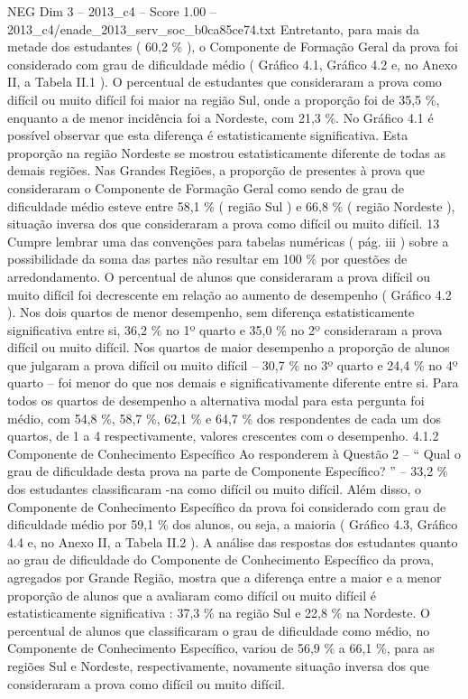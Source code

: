 \begin{textsample}{NEG Dim 3 – 2013\_c4 – Score 1.00 – 2013\_c4/enade\_2013\_serv\_soc\_b0ca85ce74.txt}
Entretanto, para mais da metade dos estudantes ( 60,2 \% ), o Componente de Formação Geral da prova foi considerado com grau de dificuldade médio ( Gráfico 4.1, Gráfico 4.2 e, no Anexo II, a Tabela II.1 ).
O percentual de estudantes que consideraram a prova como difícil ou muito difícil foi maior na região Sul, onde a proporção foi de 35,5 \%, enquanto a de menor incidência foi a Nordeste, com 21,3 \%.
No Gráfico 4.1 é possível observar que esta diferença é estatisticamente significativa.
Esta proporção na região Nordeste se mostrou estatisticamente diferente de todas as demais regiões.
Nas Grandes Regiões, a proporção de presentes à prova que consideraram o Componente de Formação Geral como sendo de grau de dificuldade médio esteve entre 58,1 \% ( região Sul ) e 66,8 \% ( região Nordeste ), situação inversa dos que consideraram a prova como difícil ou muito difícil. 13 Cumpre lembrar uma das convenções para tabelas numéricas ( pág. iii ) sobre a possibilidade da soma das partes não resultar em 100 \% por questões de arredondamento.
O percentual de alunos que consideraram a prova difícil ou muito difícil foi decrescente em relação ao aumento de desempenho ( Gráfico 4.2 ).
Nos dois quartos de menor desempenho, sem diferença estatisticamente significativa entre si, 36,2 \% no 1º quarto e 35,0 \% no 2º consideraram a prova difícil ou muito difícil.
Nos quartos de maior desempenho a proporção de alunos que julgaram a prova difícil ou muito difícil – 30,7 \% no 3º quarto e 24,4 \% no 4º quarto – foi menor do que nos demais e significativamente diferente entre si.
Para todos os quartos de desempenho a alternativa modal para esta pergunta foi médio, com 54,8 \%, 58,7 \%, 62,1 \% e 64,7 \% dos respondentes de cada um dos quartos, de 1 a 4 respectivamente, valores crescentes com o desempenho. 4.1.2 Componente de Conhecimento Específico Ao responderem à Questão 2 – “ Qual o grau de dificuldade desta prova na parte de Componente Específico? ” – 33,2 \% dos estudantes classificaram -na como difícil ou muito difícil.
Além disso, o Componente de Conhecimento Específico da prova foi considerado com grau de dificuldade médio por 59,1 \% dos alunos, ou seja, a maioria ( Gráfico 4.3, Gráfico 4.4 e, no Anexo II, a Tabela II.2 ).
A análise das respostas dos estudantes quanto ao grau de dificuldade do Componente de Conhecimento Específico da prova, agregados por Grande Região, mostra que a diferença entre a maior e a menor proporção de alunos que a avaliaram como difícil ou muito difícil é estatisticamente significativa : 37,3 \% na região Sul e 22,8 \% na Nordeste.
O percentual de alunos que classificaram o grau de dificuldade como médio, no Componente de Conhecimento Específico, variou de 56,9 \% a 66,1 \%, para as regiões Sul e Nordeste, respectivamente, novamente situação inversa dos que consideraram a prova como difícil ou muito difícil.

\end{textsample}

